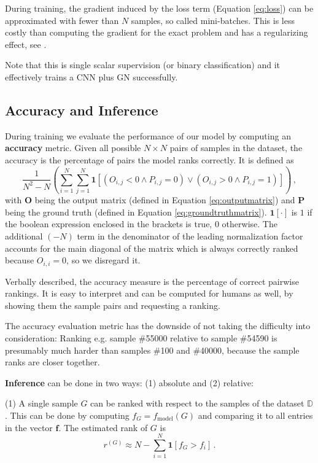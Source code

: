 During training, the gradient induced by the loss term (Equation \ref{eq:loss}) can be approximated with fewer than $N$ samples, so called mini-batches. This is less costly than computing the gradient for the exact problem and has a regularizing effect, see \cite{DBLP:journals/corr/KeskarMNST16}.

Note that this is single scalar supervision (or binary classification) and it effectively trains a CNN plus GN successfully.

\subsection{Accuracy and Inference}
\label{sec:accuracy}

During training we evaluate the performance of our model by computing an \textbf{accuracy} metric. Given all possible $N\times N$ pairs of samples in the dataset, the accuracy is the percentage of pairs the model ranks correctly. It is defined as \begin{equation}\label{eq:acc}
    \frac{1}{N^2-N}\left(\sum_{i=1}^N\sum_{j=1}^N\bm{1}\left[\left(O_{i,j}<0\land P_{i,j}=0\right)\lor\left(O_{i,j}>0\land P_{i,j}=1\right)\right]\right)\,,
\end{equation}with $\bm{O}$ being the output matrix (defined in Equation \ref{eq:outputmatrix}) and $\bm{P}$ being the ground truth (defined in Equation \ref{eq:groundtruthmatrix}). $\bm{1}\left[\cdot\right]$ is $1$ if the boolean expression enclosed in the brackets is true, $0$ otherwise. The additional $(-N)$ term in the denominator of the leading normalization factor accounts for the main diagonal of the matrix which is always correctly ranked because $O_{i,i}=0$, so we disregard it.

Verbally described, the accuracy measure is the percentage of correct pairwise rankings. It is easy to interpret and can be computed for humans as well, by showing them the sample pairs and requesting a ranking.

The accuracy evaluation metric has the downside of not taking the difficulty into consideration: Ranking e.g. sample \#55000 relative to sample \#54590 is presumably much harder than samples \#100 and \#40000, because the sample ranks are closer together.

\textbf{Inference} can be done in two ways: (1) absolute and (2) relative:

(1) A single sample $G$ can be ranked with respect to the samples of the dataset $\mathbb{D}$. This can be done by computing $f_G=f_\text{model}(G)$ and comparing it to all entries in the vector $\bm{f}$. The estimated rank of $G$ is \begin{equation}
    \label{eq:inference}
    r^{(G)}\approx N-\sum_{i=1}^N\bm{1}\left[f_G>f_i\right]\,.
\end{equation}

